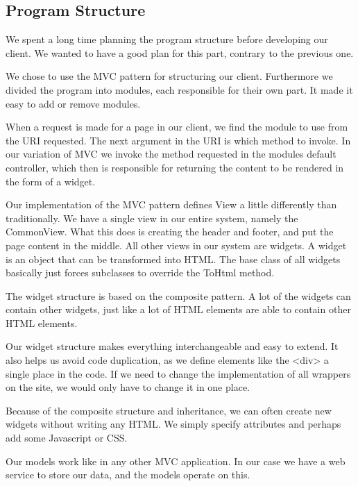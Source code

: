 \subsection{Program Structure}
We spent a long time planning the program structure before developing our client. We wanted to have a good plan for this part, contrary to the previous one.

We chose to use the MVC pattern for structuring our client.
Furthermore we divided the program into modules, each responsible for their own part. It made it easy to add or remove modules.

When a request is made for a page in our client, we find the module to use from the URI requested.
The next argument in the URI is which method to invoke. In our variation of MVC we invoke the method requested in the modules default controller, which then is responsible for returning the content to be rendered in the form of a widget.

Our implementation of the MVC pattern defines View a little differently than traditionally.
We have a single view in our entire system, namely the CommonView.
What this does is creating the header and footer, and put the page content in the middle.
All other views in our system are widgets. A widget is an object that can be transformed into HTML.
The base class of all widgets basically just forces subclasses to override the ToHtml method.

The widget structure is based on the composite pattern. A lot of the widgets can contain other widgets, just like a lot of HTML elements are able to contain other HTML elements.

Our widget structure makes everything interchangeable and easy to extend. It also helps us avoid code duplication, as we define elements like the <div> a single place in the code. If we need to change the implementation of all wrappers on the site, we would only have to change it in one place.

Because of the composite structure and inheritance, we can often create new widgets without writing any HTML. We simply specify attributes and perhaps add some Javascript or CSS.

Our models work like in any other MVC application. In our case we have a web service to store our data, and the models operate on this.
\newpage